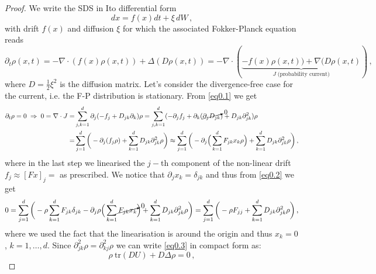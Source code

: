 \documentclass[../main.tex]{subfiles}
\begin{document}
     \begin{proof}
          We write the SDS in Ito differential form
          \begin{equation*}
               dx = f(x)dt + \xi\,dW\,,
          \end{equation*}
          with drift $f(x)$ and diffusion $\xi$ for which the associated Fokker-Planck equation reads
          \begin{equation}\label{eq0.9}
                  \partial_{t}\rho(x,t)=-\nabla\cdot(f(x)\rho(x,t))+\Delta(D\rho(x,t))=-\nabla\cdot(\underbrace{-f(x)\rho(x,t))+\nabla(D\rho(x,t)}_{J\;\text{(probability current)}})\,, 
          \end{equation}
          where $D=\frac{1}{2}\xi^{2}$ is the diffusion matrix. Let's consider the divergence-free case for the current, i.e. the F-P distribution is stationary. From \eqref{eq0.1} we get
          \begin{align}
                  \partial_{t}\rho=0\;\Rightarrow\;0=\nabla\cdot J =& \sum_{j,k=1}^{d}\partial_{j}(-f_{j}+D_{jk}\partial_{k})\rho = \sum_{j,k=1}^{d}(-\partial_{j}f_{j}+\partial_{k}(\cancelto{0}{\partial_{j}D_{jk}})+D_{jk}\partial_{jk}^{2})\rho \nonumber \\
                  =& \sum_{j=1}^{d}\bigg(-\partial_{j}(f_{j}\rho)+\sum_{k=1}^{d}D_{jk}\partial_{jk}^{2}\rho\bigg) \approx \sum_{j=1}^{d}\bigg(-\partial_{j}\Big(\sum_{k=1}^{d}F_{jk}x_{k}\rho\Big)+\sum_{k=1}^{d}D_{jk}\partial_{jk}^{2}\rho\bigg) \,, \label{eq0.10} 
          \end{align}
          where in the last step we linearised the $j-$th component of the non-linear drift $f_{j}\approx[Fx]_{j}=$ as prescribed.
          We notice that $\partial_{j}x_{k}=\delta_{jk}$ and thus from \eqref{eq0.2} we get
          \begin{equation}\label{eq0.11}
                  0 = \sum_{j=1}^{d}\bigg(-\rho \sum_{k=1}^{d}F_{jk}\delta_{jk}-\partial_{j}\rho\Big(\sum_{k=1}^{d}\cancelto{0}{F_{jk}x_{k}}\Big) + \sum_{k=1}^{d}D_{jk}\partial_{jk}^{2}\rho\bigg) = \sum_{j=1}^{d}\bigg(-\rho F_{jj}+\sum_{k=1}^{d}D_{jk}\partial_{jk}^{2}\rho\bigg)\,, 
          \end{equation}
          where we used the fact that the linearisation is around the origin and thus $x_{k}=0$, $k=1,\dots,d$. Since $\partial_{jk}^{2}\rho=\partial_{kj}^{2}\rho$ we can write \eqref{eq0.3} in compact form as:
          \begin{equation}\label{eq0.12}
               \rho\:\text{tr}(DU) + D\Delta\rho=0\,,
          \end{equation}

\end{proof}
\end{document}
